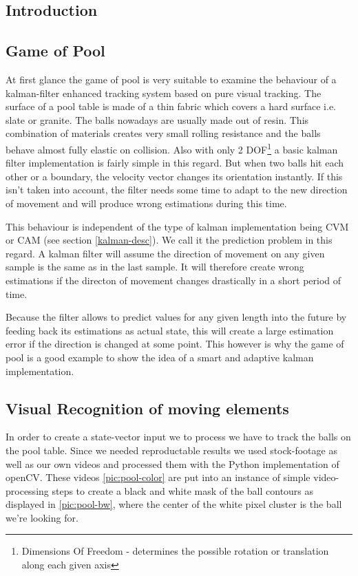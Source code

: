 \documentclass[notitlepage, a4paper, 11pt]{scrartcl}
\begin{document}
\begin{multicols}{2}
\section{Introduction}

\subsection{Game of Pool}

At first glance the game of pool is very suitable to examine the behaviour of a kalman-filter enhanced tracking system based on pure visual tracking. 
The surface of a pool table is made of a thin fabric which covers a hard surface i.e. slate or granite.
The balls nowadays are usually made out of resin. This combination of materials creates very small rolling resistance and the balls behave almost fully elastic on collision.
Also with only 2 DOF\footnote{Dimensions Of Freedom - determines the possible rotation or translation along each given axis} a basic kalman filter implementation is fairly simple in this regard. But when two balls hit each other or a boundary, the velocity vector
changes its orientation instantly. If this isn't taken into account, the filter needs some time to adapt to the new direction of movement and will produce wrong estimations during this time.

This behaviour is independent of the type of kalman implementation being CVM or CAM (see section \ref{kalman-desc}). We call it the prediction problem in this regard.
A kalman filter will assume the direction of movement on any given sample is the same as in the last sample. 
It will therefore create wrong estimations if the directon of movement changes drastically in a short period of time.

Because the filter allows to predict values for any given length into the future by feeding back its estimations as actual state,
this will create a large estimation error if the direction is changed at some point. This however is why the game of pool is a good example to show the idea of a smart and adaptive kalman implementation.

\subsection{Visual Recognition of moving elements}

In order to create a state-vector input we to process we have to track the balls on the pool table. 
Since we needed reproductable results we used stock-footage as well as our own videos and processed them with the Python implementation of openCV.
These videos \ref{pic:pool-color} are put into an instance of simple video-processing steps to create a black and white mask of the ball contours as displayed in \ref{pic:pool-bw},
where the center of the white pixel cluster is the ball we're looking for.


\end{multicols}
\end{document}
